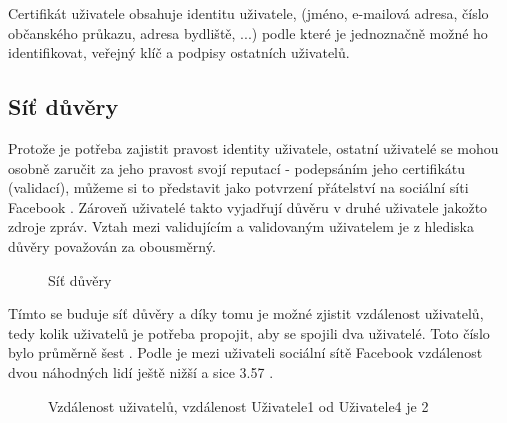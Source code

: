 \documentclass[a4papper]{article}
\begin{document}
Certifikát uživatele obsahuje identitu uživatele, (jméno, e-mailová adresa, číslo občanského průkazu, adresa bydliště, ...) podle které je jednoznačně možné ho identifikovat, veřejný klíč a podpisy ostatních uživatelů.

\subsection{Síť důvěry}
\label{sec:sit_duvery}

Protože je potřeba zajistit pravost identity uživatele, ostatní uživatelé se mohou osobně zaručit za jeho pravost svojí reputací - podepsáním jeho certifikátu (validací), můžeme si to představit jako potvrzení přátelství na sociální síti Facebook \citep{intro99}. Zároveň uživatelé takto vyjadřují důvěru v druhé uživatele jakožto zdroje zpráv. Vztah  mezi validujícím a validovaným uživatelem je z hlediska důvěry považován za obousměrný.

\begin{figure}
\centering
{}
\caption{Síť důvěry}
\end{figure}

Tímto se buduje síť důvěry a díky tomu je možné zjistit vzdálenost uživatelů, tedy kolik uživatelů je potřeba propojit, aby se spojili dva uživatelé. Toto číslo bylo průměrně šest \citep{intro99,travers69}. Podle \citeauthor{edunov16} je mezi uživateli sociální sítě Facebook vzdálenost dvou náhodných lidí ještě nižší a sice 3.57 \citep{edunov16}.

\begin{figure}
\centering
{}
\caption{Vzdálenost uživatelů, vzdálenost Uživatele1 od Uživatele4 je 2}
\end{figure}
\end{document}
